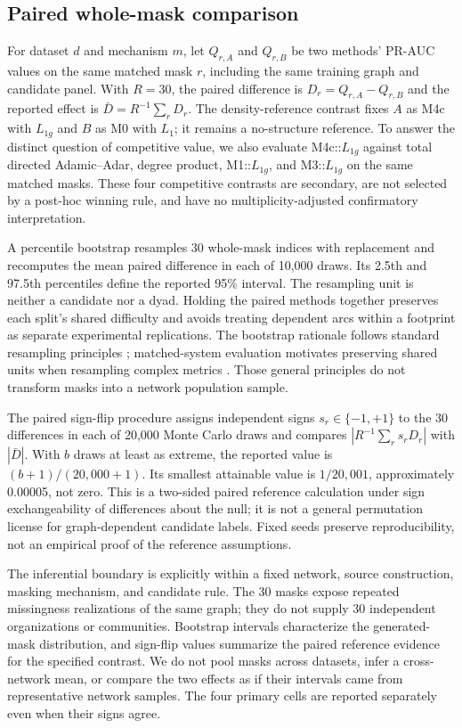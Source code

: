 \documentclass[10pt]{article}
\begin{document}
\subsection{Paired whole-mask comparison}
For dataset $d$ and mechanism $m$, let $Q_{r,A}$ and $Q_{r,B}$ be two methods' PR-AUC values on the same matched mask $r$, including the same training graph and candidate panel. With $R=30$, the paired difference is $D_r=Q_{r,A}-Q_{r,B}$ and the reported effect is $\bar D=R^{-1}\sum_rD_r$. The density-reference contrast fixes $A$ as M4c with $L_{1g}$ and $B$ as M0 with $L_1$; it remains a no-structure reference. To answer the distinct question of competitive value, we also evaluate M4c::$L_{1g}$ against total directed Adamic--Adar, degree product, M1::$L_{1g}$, and M3::$L_{1g}$ on the same matched masks. These four competitive contrasts are secondary, are not selected by a post-hoc winning rule, and have no multiplicity-adjusted confirmatory interpretation.

A percentile bootstrap resamples 30 whole-mask indices with replacement and recomputes the mean paired difference in each of 10,000 draws. Its 2.5th and 97.5th percentiles define the reported 95\% interval. The resampling unit is neither a candidate nor a dyad. Holding the paired methods together preserves each split's shared difficulty and avoids treating dependent arcs within a footprint as separate experimental replications. The bootstrap rationale follows standard resampling principles \citep{efronTibshirani1994}; matched-system evaluation motivates preserving shared units when resampling complex metrics \citep{bergKirkpatrickEtAl2012}. Those general principles do not transform masks into a network population sample.

The paired sign-flip procedure assigns independent signs $s_r\in\{-1,+1\}$ to the 30 differences in each of 20,000 Monte Carlo draws and compares $|R^{-1}\sum_rs_rD_r|$ with $|\bar D|$. With $b$ draws at least as extreme, the reported value is $(b+1)/(20{,}000+1)$. Its smallest attainable value is $1/20{,}001$, approximately 0.00005, not zero. This is a two-sided paired reference calculation under sign exchangeability of differences about the null; it is not a general permutation license for graph-dependent candidate labels. Fixed seeds preserve reproducibility, not an empirical proof of the reference assumptions.

The inferential boundary is explicitly within a fixed network, source construction, masking mechanism, and candidate rule. The 30 masks expose repeated missingness realizations of the same graph; they do not supply 30 independent organizations or communities. Bootstrap intervals characterize the generated-mask distribution, and sign-flip values summarize the paired reference evidence for the specified contrast. We do not pool masks across datasets, infer a cross-network mean, or compare the two effects as if their intervals came from representative network samples. The four primary cells are reported separately even when their signs agree.
\end{document}
